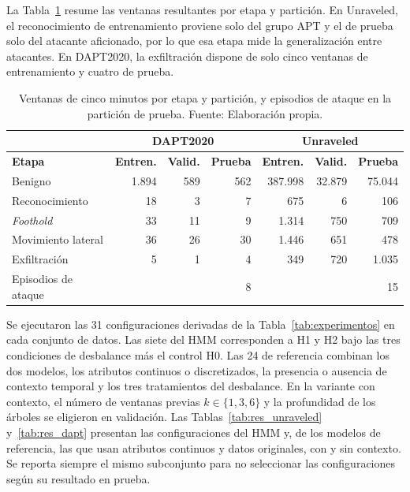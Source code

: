 La Tabla~\ref{tab:ventanas_particion} resume las ventanas resultantes por etapa y partición. En Unraveled, el reconocimiento de entrenamiento proviene solo del grupo APT y el de prueba solo del atacante aficionado, por lo que esa etapa mide la generalización entre atacantes. En DAPT2020, la exfiltración dispone de solo cinco ventanas de entrenamiento y cuatro de prueba.

\begin{table}[h!]
\centering
\small
\renewcommand{\arraystretch}{1.25}
\begin{tabular}{|l|r|r|r|r|r|r|}
\hline
 & \multicolumn{3}{c|}{\textbf{DAPT2020}} & \multicolumn{3}{c|}{\textbf{Unraveled}} \\ \hline
\textbf{Etapa} & \textbf{Entren.} & \textbf{Valid.} & \textbf{Prueba} & \textbf{Entren.} & \textbf{Valid.} & \textbf{Prueba} \\ \hline
Benigno & 1.894 & 589 & 562 & 387.998 & 32.879 & 75.044 \\ \hline
Reconocimiento & 18 & 3 & 7 & 675 & 6 & 106 \\ \hline
\textit{Foothold} & 33 & 11 & 9 & 1.314 & 750 & 709 \\ \hline
Movimiento lateral & 36 & 26 & 30 & 1.446 & 651 & 478 \\ \hline
Exfiltración & 5 & 1 & 4 & 349 & 720 & 1.035 \\ \hline
Episodios de ataque & & & 8 & & & 15 \\ \hline
\end{tabular}
\caption[Ventanas de cinco minutos por etapa y partición.]{Ventanas de cinco minutos por etapa y partición, y episodios de ataque en la partición de prueba. Fuente: Elaboración propia.}
\label{tab:ventanas_particion}
\end{table}
\FloatBarrier

Se ejecutaron las 31 configuraciones derivadas de la Tabla~\ref{tab:experimentos} en cada conjunto de datos. Las siete del HMM corresponden a H1 y H2 bajo las tres condiciones de desbalance más el control H0. Las 24 de referencia combinan los dos modelos, los atributos continuos o discretizados, la presencia o ausencia de contexto temporal y los tres tratamientos del desbalance. En la variante con contexto, el número de ventanas previas $k \in \{1, 3, 6\}$ y la profundidad de los árboles se eligieron en validación. Las Tablas~\ref{tab:res_unraveled} y~\ref{tab:res_dapt} presentan las configuraciones del HMM y, de los modelos de referencia, las que usan atributos continuos y datos originales, con y sin contexto. Se reporta siempre el mismo subconjunto para no seleccionar las configuraciones según su resultado en prueba.

